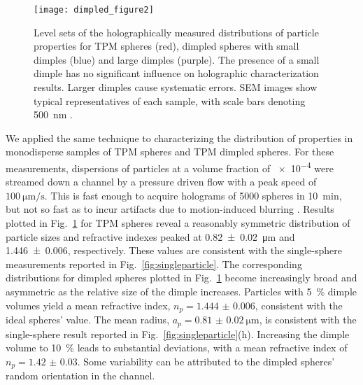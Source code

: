 \begin{figure}[!t]
  \centering
  \texttt{[image: dimpled\_figure2]}
  \caption{Level sets of the holographically measured 
    distributions of particle properties for TPM spheres
    (red), dimpled spheres with small dimples (blue) and
    large dimples (purple).  The presence of a small dimple
    has no significant influence on holographic characterization
    results.  Larger dimples cause systematic errors.
    SEM images show typical representatives of each sample,
    with scale bars denoting \SI{500}{\nm} \cite{hannel15}.}
  \label{fig:distributions}
\end{figure}

We applied the same technique to characterizing the distribution
of properties in monodisperse samples of TPM spheres and 
TPM dimpled spheres.
For these measurements, dispersions of particles at a volume fraction
of \num{e-4} were streamed down a channel by a pressure driven flow
with a peak speed of $\SI{100}{\um\per\second}$.  This is fast enough
to acquire holograms of \num{5000} spheres in \SI{10}{\minute}, but
not so fast as to incur artifacts due to motion-induced blurring
\cite{cheong09,dixon11}.
Results plotted in Fig.~\ref{fig:distributions} for TPM spheres reveal
a reasonably symmetric distribution of particle sizes and refractive
indexes peaked at \SI{0.82(2)}{\um} and \num{1.446(6)}, respectively.
These values are consistent with the single-sphere measurements
reported in Fig.~\ref{fig:singleparticle}.
The corresponding distributions for dimpled spheres plotted in
Fig.~\ref{fig:distributions} become increasingly broad and asymmetric
as the relative size of the dimple increases.
Particles with \SI{5}{\percent} dimple volumes yield a mean refractive
index, $n_p=\num{1.444(6)}$, consistent with the ideal spheres' value.
The mean radius, $a_p=\SI{0.81(2)}{\um}$, is consistent with the
  single-sphere result reported in Fig.~\ref{fig:singleparticle}(h).
Increasing the dimple volume to \SI{10}{\percent} leads to
substantial deviations, with a mean refractive index of
$n_p=\num{1.42(3)}$.
Some variability can be attributed to the dimpled spheres'
random orientation in the channel.

